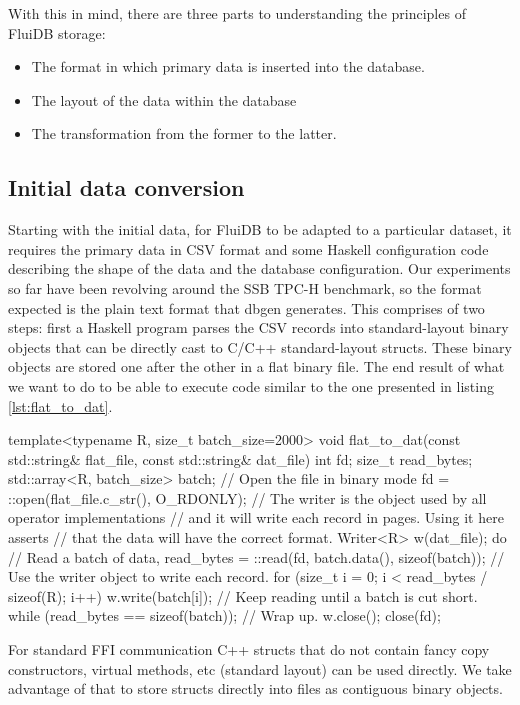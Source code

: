 With this in mind, there are three parts to understanding the
principles of FluiDB storage:

\begin{itemize}
\item The format in which primary data is inserted into the database.
\item The layout of the data within the database
\item The transformation from the former to the latter.
\end{itemize}

\subsection{Initial data conversion}

Starting with the initial data, for FluiDB to be adapted to a
particular dataset, it requires the primary data in CSV format and
some Haskell configuration code describing the shape of the data and
the database configuration. Our experiments so far have been revolving
around the SSB TPC-H benchmark, so the format expected is the plain
text format that dbgen \cite{perivolaropoulosFakedrakeSsbdbgen2021}
generates. This comprises of two steps: first a Haskell program parses
the CSV records into standard-layout binary objects that can be
directly cast to C/C++ standard-layout structs. These binary objects
are stored one after the other in a flat binary file. The end result
of what we want to do to be able to execute code similar to the one
presented in listing \ref{lst:flat_to_dat}.

\begin{code}
\begin{cppcode}
template<typename R, size_t batch_size=2000>
void flat_to_dat(const std::string& flat_file, const std::string& dat_file) {
  int fd;
  size_t read_bytes;
  std::array<R, batch_size> batch;
  // Open the file in binary mode
  fd = ::open(flat_file.c_str(), O_RDONLY);
  // The writer is the object used by all operator implementations
  // and it will write each record in pages. Using it here asserts
  // that the data will have the correct format.
  Writer<R> w(dat_file);
  do {
    // Read a batch of data,
    read_bytes = ::read(fd, batch.data(), sizeof(batch));
    // Use the writer object to write each record.
    for (size_t i = 0; i < read_bytes / sizeof(R); i++) {
      w.write(batch[i]);
    }
    // Keep reading until a batch is cut short.
  } while (read_bytes == sizeof(batch));
  // Wrap up.
  w.close();
  close(fd);
}
\end{cppcode}
  \caption{\label{lst:flat_to_dat}For standard FFI communication C++
    structs that do not contain fancy copy constructors, virtual
    methods, etc (standard layout) can be used directly. We take
    advantage of that to store structs directly into files as
    contiguous binary objects.}
\end{code}

